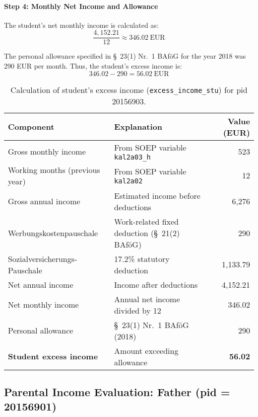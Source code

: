 \paragraph{Step 4: Monthly Net Income and Allowance}
The student’s net monthly income is calculated as:
\[
\frac{4{,}152.21}{12} \approx 346.02~\text{EUR}
\]

The personal allowance specified in §~23(1) Nr.~1 BAföG for the year 2018 was 290 EUR per month. Thus, the student’s excess income is:
\[
346.02 - 290 = 56.02~\text{EUR}
\]

\begin{table}[H]
\scriptsize
\centering
\begin{tabular}{llr}
\toprule
\textbf{Component} & \textbf{Explanation} & \textbf{Value (EUR)} \\
\midrule
Gross monthly income & From SOEP variable \texttt{kal2a03\_h} & 523 \\
Working months (previous year) & From SOEP variable \texttt{kal2a02} & 12 \\
Gross annual income & Estimated income before deductions & 6,276 \\
Werbungskostenpauschale & Work-related fixed deduction (§~21(2) BAföG) & 290 \\
Sozialversicherungs-Pauschale & 17.2\% statutory deduction & 1,133.79 \\
Net annual income & Income after deductions & 4,152.21 \\
Net monthly income & Annual net income divided by 12 & 346.02 \\
Personal allowance & §~23(1) Nr.~1 BAföG (2018) & 290 \\
\textbf{Student excess income} & Amount exceeding allowance & \textbf{56.02} \\
\bottomrule
\end{tabular}
\caption{Calculation of student’s excess income (\texttt{excess\_income\_stu}) for pid 20156903.}
\label{table:bafoeg_excess_income_stu}
\end{table}



\subsection{Parental Income Evaluation: Father (pid = 20156901)}

